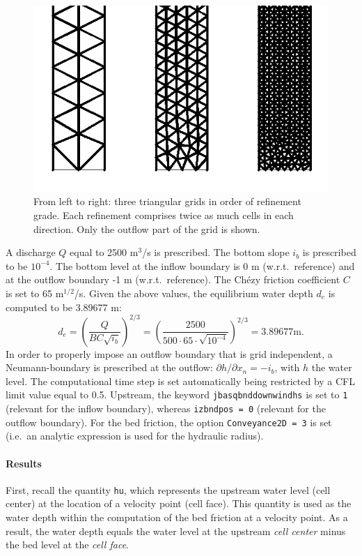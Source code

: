 \begin{figure}[h!]
\begin{center}
\includegraphics[width=0.5\columnwidth]{figures/grids.png}
\end{center}\caption{From left to right: three triangular grids in order of refinement grade. Each refinement comprises twice as much cells in each direction. Only the outflow part of the grid is shown. \label{fig:chezytrianglesgrids}}
\end{figure}

A discharge $Q$ equal to 2500 m$^3$/s is prescribed. The bottom slope $i_b$ is prescribed to be $10^{-4}$. The bottom level at the inflow boundary is 0 m (w.r.t.\ reference) and at the outflow boundary -1 m (w.r.t.\ reference). The Ch\'ezy friction coefficient $C$ is set to 65 m$^{1/2}$/s. Given the above values, the equilibrium water depth $d_e$ is computed to be 3.89677 m:
\begin{equation}
d_{e} = \left(\frac{Q}{B C \sqrt{i_b}}\right)^{2/3} = \left(\frac{2500}{500 \cdot 65 \cdot \sqrt{10^{-4}}}\right)^{2/3}  = 3.89677\textrm{m}.
\end{equation}
In order to properly impose an outflow boundary that is grid independent, a Neumann-boundary is prescribed at the outflow: $\partial h / \partial x_n = -i_b$, with $h$ the water level. The computational time step is set automatically being restricted by a CFL limit value equal to 0.5. Upstream, the keyword \texttt{jbasqbnddownwindhs} is set to \texttt{1} (relevant for the inflow boundary), whereas \texttt{izbndpos = 0} (relevant for the outflow boundary). For the bed friction, the option \texttt{Conveyance2D = 3} is set (i.e.\ an analytic expression is used for the hydraulic radius).



\paragraph*{Results}
First, recall the quantity \texttt{hu}, which represents the upstream water level (cell center) at the location of a velocity point (cell face). This quantity is used as the water depth within the computation of the bed friction at a velocity point. As a result, the water depth equals the water level at the upstream \emph{cell center} minus the bed level at the \emph{cell face}.

